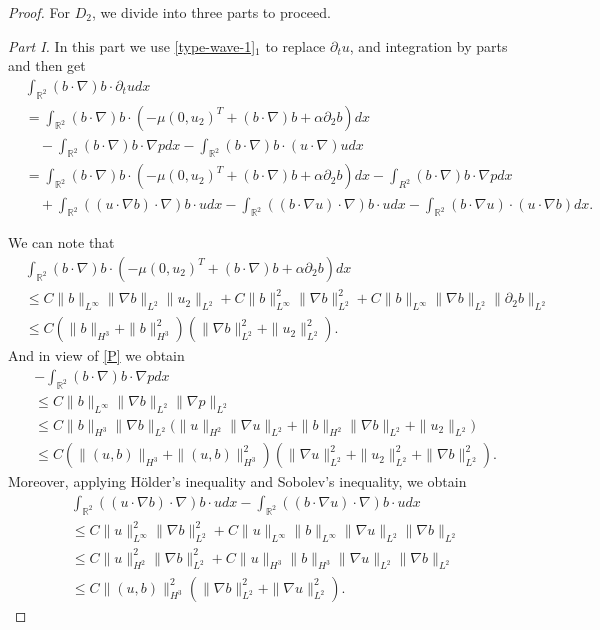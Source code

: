 \documentclass[reqno,11pt]{amsart}
\def\R{\mathbb R}
\numberwithin{Thm}{section}
\begin{document}
\begin{proof}
 For $D_{2}$, we divide into three parts to proceed.


 {\it {Part I.}} In this part we  use \eqref{type-wave-1}$_1$ to replace $\partial_tu$, and integration by parts and then get
\begin{align}\label{diff decom-1}
&\int_{\R^2}(b\cdot \nabla)b\cdot \partial_tudx\nonumber\\
&=\int_{\R^2}(b\cdot\nabla) b\cdot(-\mu (0,u_2)^{T}  +(b \cdot \nabla) b+\alpha\partial_2 b)dx
\nonumber\\
&\quad-\int_{\R^2}(b\cdot\nabla) b\cdot\nabla pdx-\int_{\R^2}(b\cdot\nabla) b\cdot (u\cdot\nabla) udx
\nonumber\\
&=\int_{\R^2}(b\cdot\nabla) b\cdot(-\mu (0,u_2)^{T} +(b \cdot \nabla) b+\alpha\partial_2 b)dx-\int_{R^2}(b\cdot\nabla) b\cdot\nabla pdx
\nonumber\\
&\quad+\int_{\R^2}((u\cdot \nabla b)\cdot \nabla)b\cdot udx-\int_{\R^2}((b\cdot \nabla u)\cdot \nabla)b\cdot u dx-\int_{\R^2}(b\cdot \nabla u)\cdot(u\cdot \nabla b)dx.
\end{align}

We can note that
\begin{align}\label{D21}
&\int_{\R^2}(b\cdot\nabla) b\cdot(-\mu (0,u_2)^{T}  +(b \cdot \nabla) b+\alpha\partial_2 b)dx\nonumber\\&
\leq
C\|b\|_{L^\infty}\|\nabla b\|_{L^2}\|u_2\|_{L^2}+C\|b\|_{L^\infty}^2\|\nabla b\|_{L^2}^2+C\|b\|_{L^\infty}\|\nabla b\|_{L^2}\|\partial_2b\|_{L^2}\nonumber\\
&\leq C\left(\|b\|_{H^3}+\|b\|_{H^3}^2\right)\left(\|\nabla b\|_{L^2}^2+\|u_2\|_{L^2}^2\right).
\end{align}
And in view of \eqref{P} we obtain
\begin{align}\label{D22}
&-\int_{\R^2}(b\cdot\nabla) b\cdot\nabla pdx
\nonumber\\&\leq
C\|b\|_{L^\infty}\|\nabla b\|_{L^2}\|\nabla p\|_{L^2}\nonumber\\
&\leq C\|b\|_{H^3}\|\nabla b\|_{L^2}\Big(\|u\|_{H^2}\|\nabla u\|_{L^{2}}+\|b\|_{H^2}\|\nabla b\|_{L^{2}}+\|u_2\|_{L^2}\Big)\nonumber\\
&\leq C\left(\|(u,b)\|_{H^3}+\|(u,b)\|_{H^3}^2\right)\left(\|\nabla u\|_{L^{2}}^2+\|u_2\|_{L^2}^2+\|\nabla b\|_{L^2}^2\right).
\end{align}
Moreover, applying H\"{o}lder's inequality and Sobolev's inequality, we obtain
\begin{align}\label{D23-1}
&\int_{\R^2}((u\cdot \nabla b)\cdot \nabla)b\cdot udx-\int_{\R^2}((b\cdot \nabla u)\cdot \nabla)b\cdot u dx
\nonumber\\ &\leq
C\|u\|_{L^\infty}^2\|\nabla b\|_{L^2}^2+C\|u\|_{L^\infty}\|b\|_{L^\infty}\|\nabla u\|_{L^2}\|\nabla b\|_{L^2}\nonumber\\
&\leq C\|u\|_{H^2}^2\|\nabla b\|_{L^2}^2+C\|u\|_{H^3}\|b\|_{H^3}\|\nabla u\|_{L^2}\|\nabla b\|_{L^2}\nonumber\\
&\leq C\|(u,b)\|_{H^3}^2\left(\|\nabla b\|_{L^2}^2+\|\nabla u\|_{L^2}^2\right).
\end{align}



\end{proof}
\end{document}
